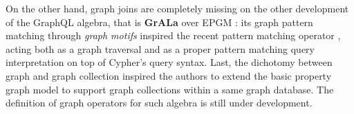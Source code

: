 On the other hand, graph joins are completely missing on the other development of the GraphQL algebra, that is \textbf{GrALa} over EPGM \cite{apacheflink}: its graph pattern matching through \textit{graph motifs} inspired the recent pattern matching operator \cite{JunghannsKAPR17}, acting both as a graph traversal and as a proper pattern matching query interpretation on top of Cypher's query syntax. Last, the dichotomy between graph and graph collection inspired the authors to extend the basic property graph model to support graph collections within a same graph database. The definition of graph operators for such algebra is still under development.
